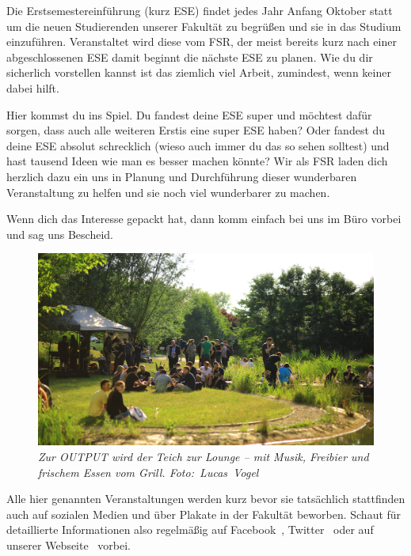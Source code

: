 Die Erstsemestereinführung (kurz ESE) findet jedes Jahr Anfang Oktober statt um die neuen Studierenden unserer Fakultät zu begrüßen und sie in das Studium einzuführen. Veranstaltet wird diese vom FSR, der meist bereits kurz nach einer abgeschlossenen ESE damit beginnt die nächste ESE zu planen. Wie du dir sicherlich vorstellen kannst ist das ziemlich viel Arbeit, zumindest, wenn keiner dabei hilft.

Hier kommst du ins Spiel. Du fandest deine ESE super und möchtest dafür sorgen, dass auch alle weiteren Erstis eine super ESE haben? Oder fandest du deine ESE absolut schrecklich (wieso auch immer du das so sehen solltest) und hast tausend Ideen wie man es besser machen könnte? Wir als FSR laden dich herzlich dazu ein uns in Planung und Durchführung dieser wunderbaren Veranstaltung zu helfen und sie noch viel wunderbarer zu machen.

Wenn dich das Interesse gepackt hat, dann komm einfach bei uns im Büro vorbei und sag uns Bescheid.

\begin{figure}[b!]
  \centering
  \includegraphics[width=\linewidth]{img/output_pond}
  \caption*{\small \centering \textit{Zur OUTPUT wird der Teich zur Lounge -- mit Musik, Freibier und frischem Essen vom Grill. Foto:~Lucas~Vogel}}
\end{figure}



Alle hier genannten Veranstaltungen werden kurz bevor sie tatsächlich stattfinden auch auf sozialen Medien und über Plakate in der Fakultät beworben. Schaut für detaillierte Informationen also regelmäßig auf Facebook~, Twitter~ oder auf unserer Webseite~ vorbei.
